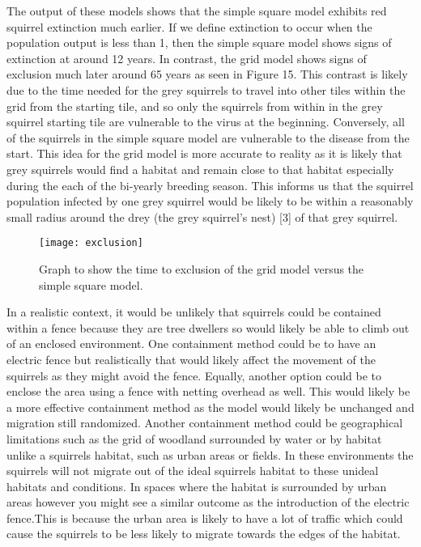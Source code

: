 \documentclass{article}
\begin{document}
The output of these models shows that the simple square model exhibits red squirrel extinction much earlier. If we define extinction to occur when the population output is less than 1, then the simple square model shows signs of extinction at around 12 years. In contrast, the grid model shows signs of exclusion much later around 65 years as seen in Figure 15. This contrast is likely due to the time needed for the grey squirrels to travel into other tiles within the grid from the starting tile, and so only the squirrels from within in the grey squirrel starting tile are vulnerable to the virus at the beginning. Conversely, all of the squirrels in the simple square model are vulnerable to the disease from the start. This idea for the grid model is more accurate to reality as it is likely that grey squirrels would find a habitat and remain close to that habitat especially during the each of the bi-yearly breeding season. This informs us that the squirrel population infected by one grey squirrel would be likely to be within a reasonably small radius around the drey (the grey squirrel’s nest) [3] of that grey squirrel. 

\begin{figure}[H]
\begin{center}
\texttt{[image: exclusion]}
\caption{Graph to show the time to exclusion of the grid model versus the simple square model.}
\end{center}
\end{figure}

In a realistic context, it would be unlikely that squirrels could be contained within a fence because they are tree dwellers so would likely be able to climb out of an enclosed environment. One containment method could be to have an electric fence but realistically that would likely affect the movement of the squirrels as they might avoid the fence. Equally, another option could be to enclose the area using a fence with netting overhead as well. This would likely be a more effective containment method as the model would likely be unchanged and migration still randomized. Another containment method could be geographical limitations such as the grid of woodland surrounded by water or by habitat unlike a squirrels habitat, such as urban areas or fields.  In these environments the squirrels will not migrate out of the ideal squirrels habitat to these unideal habitats and conditions. In spaces where the habitat is surrounded by urban areas however you might see a similar outcome as the introduction of the electric fence.This is because the urban area is likely to have a lot of traffic which could cause the squirrels to be less likely to migrate towards the edges of the habitat. 
\end{document}
